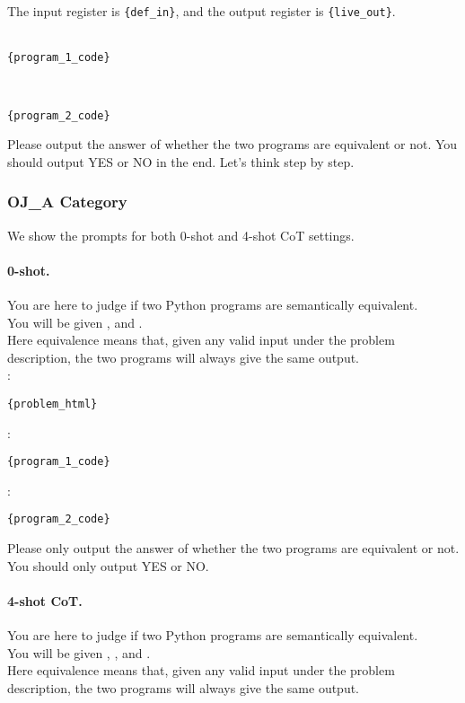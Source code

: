The input register is \texttt{\{def\_in\}}, and the output register is \texttt{\{live\_out\}}.\\
\text{[Program 1]:}\\
\begin{lstlisting}
{program_1_code}
\end{lstlisting}
\text{[Program 2]:}\\
\begin{lstlisting}
{program_2_code}
\end{lstlisting}

Please output the answer of whether the two programs are equivalent or not. You should output YES or NO in the end. Let's think step by step.


\subsubsection{OJ\_A Category}
We show the prompts for both 0-shot and 4-shot CoT settings.

\paragraph{0-shot.} You are here to judge if two Python programs are semantically equivalent.\\
    You will be given , \text{[Program 1]} and \text{[Program 2]}.\\
    Here equivalence means that, given any valid input under the problem description, the two programs will always give the same output.\\

\noindent{}:\\
\begin{lstlisting}
{problem_html}
\end{lstlisting}

\noindent\text{[Program 1]}:\\
\begin{lstlisting}
{program_1_code}
\end{lstlisting}

\noindent\text{[Program 2]}:\\
\begin{lstlisting}
{program_2_code}
\end{lstlisting}

Please only output the answer of whether the two programs are equivalent or not. You should only output YES or NO.

\paragraph{4-shot CoT.} You are here to judge if two Python programs are semantically equivalent.\\
You will be given , \text{[Program 1]}, and \text{[Program 2]}.\\
Here equivalence means that, given any valid input under the problem description, the two programs will always give the same output.\\

